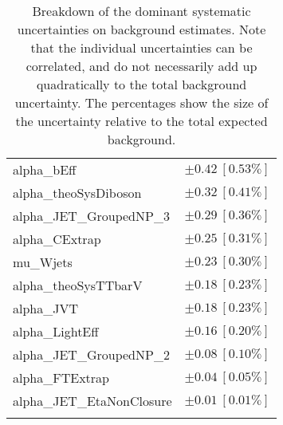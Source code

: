 \begin{table}
\begin{center}
\begin{tabular*}{\textwidth}{@{\extracolsep{\fill}}lc}
alpha\_bEff         & $\pm 0.42\ [0.53\%] $       \\
alpha\_theoSysDiboson         & $\pm 0.32\ [0.41\%] $       \\
alpha\_JET\_GroupedNP\_3         & $\pm 0.29\ [0.36\%] $       \\
alpha\_CExtrap         & $\pm 0.25\ [0.31\%] $       \\
mu\_Wjets         & $\pm 0.23\ [0.30\%] $       \\
alpha\_theoSysTTbarV         & $\pm 0.18\ [0.23\%] $       \\
alpha\_JVT         & $\pm 0.18\ [0.23\%] $       \\
alpha\_LightEff         & $\pm 0.16\ [0.20\%] $       \\
alpha\_JET\_GroupedNP\_2         & $\pm 0.08\ [0.10\%] $       \\
alpha\_FTExtrap         & $\pm 0.04\ [0.05\%] $       \\
alpha\_JET\_EtaNonClosure         & $\pm 0.01\ [0.01\%] $       \\
\noalign{\smallskip}\hline\noalign{\smallskip}
\end{tabular*}
\end{center}
\caption[Breakdown of uncertainty on background estimates]{
Breakdown of the dominant systematic uncertainties on background estimates.
Note that the individual uncertainties can be correlated, and do not necessarily add up quadratically to 
the total background uncertainty. The percentages show the size of the uncertainty relative to the total expected background.
\label{table.results.bkgestimate.uncertainties.VRTopATT}}
\end{table}
%